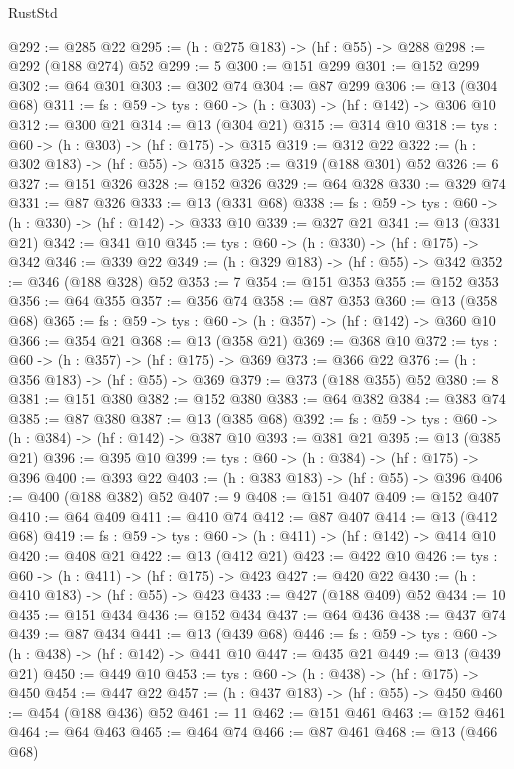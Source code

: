 \begin{lexlean}{RustStd}
\begin{coremodule}
@292 := @285 @22
@295 := (h : @275 @183) -> (hf : @55) -> @288
@298 := @292 (@188 @274) @52
@299 := 5
@300 := @151 @299
@301 := @152 @299
@302 := @64 @301
@303 := @302 @74
@304 := @87 @299
@306 := @13 (@304 @68)
@311 := {fs : @59} -> {tys : @60} -> (h : @303) -> (hf : @142) -> @306 @10
@312 := @300 @21
@314 := @13 (@304 @21)
@315 := @314 @10
@318 := {tys : @60} -> (h : @303) -> (hf : @175) -> @315
@319 := @312 @22
@322 := (h : @302 @183) -> (hf : @55) -> @315
@325 := @319 (@188 @301) @52
@326 := 6
@327 := @151 @326
@328 := @152 @326
@329 := @64 @328
@330 := @329 @74
@331 := @87 @326
@333 := @13 (@331 @68)
@338 := {fs : @59} -> {tys : @60} -> (h : @330) -> (hf : @142) -> @333 @10
@339 := @327 @21
@341 := @13 (@331 @21)
@342 := @341 @10
@345 := {tys : @60} -> (h : @330) -> (hf : @175) -> @342
@346 := @339 @22
@349 := (h : @329 @183) -> (hf : @55) -> @342
@352 := @346 (@188 @328) @52
@353 := 7
@354 := @151 @353
@355 := @152 @353
@356 := @64 @355
@357 := @356 @74
@358 := @87 @353
@360 := @13 (@358 @68)
@365 := {fs : @59} -> {tys : @60} -> (h : @357) -> (hf : @142) -> @360 @10
@366 := @354 @21
@368 := @13 (@358 @21)
@369 := @368 @10
@372 := {tys : @60} -> (h : @357) -> (hf : @175) -> @369
@373 := @366 @22
@376 := (h : @356 @183) -> (hf : @55) -> @369
@379 := @373 (@188 @355) @52
@380 := 8
@381 := @151 @380
@382 := @152 @380
@383 := @64 @382
@384 := @383 @74
@385 := @87 @380
@387 := @13 (@385 @68)
@392 := {fs : @59} -> {tys : @60} -> (h : @384) -> (hf : @142) -> @387 @10
@393 := @381 @21
@395 := @13 (@385 @21)
@396 := @395 @10
@399 := {tys : @60} -> (h : @384) -> (hf : @175) -> @396
@400 := @393 @22
@403 := (h : @383 @183) -> (hf : @55) -> @396
@406 := @400 (@188 @382) @52
@407 := 9
@408 := @151 @407
@409 := @152 @407
@410 := @64 @409
@411 := @410 @74
@412 := @87 @407
@414 := @13 (@412 @68)
@419 := {fs : @59} -> {tys : @60} -> (h : @411) -> (hf : @142) -> @414 @10
@420 := @408 @21
@422 := @13 (@412 @21)
@423 := @422 @10
@426 := {tys : @60} -> (h : @411) -> (hf : @175) -> @423
@427 := @420 @22
@430 := (h : @410 @183) -> (hf : @55) -> @423
@433 := @427 (@188 @409) @52
@434 := 10
@435 := @151 @434
@436 := @152 @434
@437 := @64 @436
@438 := @437 @74
@439 := @87 @434
@441 := @13 (@439 @68)
@446 := {fs : @59} -> {tys : @60} -> (h : @438) -> (hf : @142) -> @441 @10
@447 := @435 @21
@449 := @13 (@439 @21)
@450 := @449 @10
@453 := {tys : @60} -> (h : @438) -> (hf : @175) -> @450
@454 := @447 @22
@457 := (h : @437 @183) -> (hf : @55) -> @450
@460 := @454 (@188 @436) @52
@461 := 11
@462 := @151 @461
@463 := @152 @461
@464 := @64 @463
@465 := @464 @74
@466 := @87 @461
@468 := @13 (@466 @68)

\end{coremodule}
\end{lexlean}
